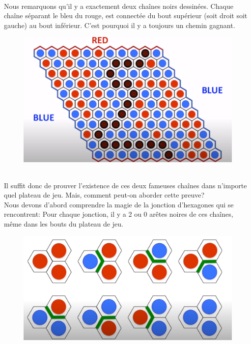 \documentclass{article}
\begin{document}
\\
Nous remarquons qu'il y a exactement deux chaînes noirs dessinées. Chaque chaîne séparant le bleu du rouge, est connectée du bout supérieur (soit droit soit gauche) au bout inférieur. C'est pourquoi il y a toujours un chemin gagnant.\\
\begin{figure}[ht]
    \centering
    \includegraphics[scale=0.5]{chemingagne.png}
    \label{fig:chemingagne}
\end{figure}
\\
Il suffit donc de prouver l'existence de ces deux fameuses chaînes dans n'importe quel plateau de jeu. Mais, comment peut-on aborder cette preuve?\\
Nous devons d'abord comprendre la magie de la jonction d'hexagones qui se rencontrent: Pour chaque jonction, il y a 2 ou 0 arêtes noires de ces chaînes, même dans les bouts du plateau de jeu.\\
\begin{figure}[ht]
    \centering
    \includegraphics[scale=0.5]{joint.png}
\end{figure}
\\
\end{document}
